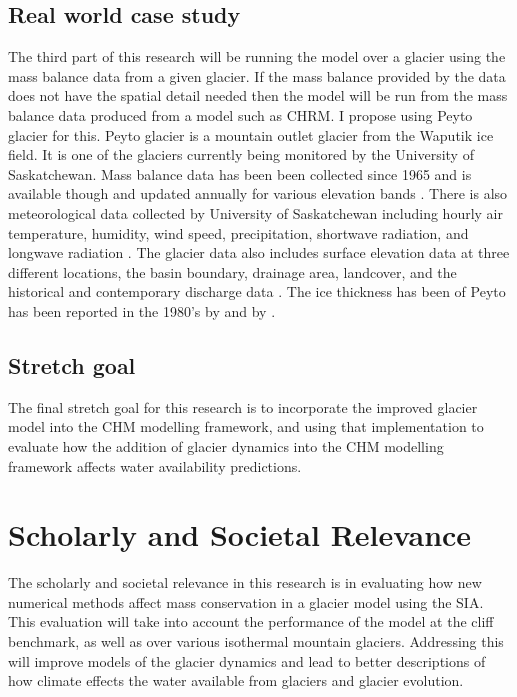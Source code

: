 \documentclass{article}
\begin{document}
\subsection{Real world case study}
The third part of this research will be running the model over a glacier using the mass balance data from a given glacier. If the mass balance provided by the data does not have the spatial detail needed then the model will be run from the mass balance data produced from a model such as CHRM. I propose using Peyto glacier for this. Peyto glacier is a mountain outlet glacier from the Waputik ice field. It is one of the glaciers currently being monitored by the University of Saskatchewan. Mass balance data has been been collected since 1965 and is available though \citet{WGMS2020} and updated annually for various elevation bands \citep{Pradhananga2020}. There is also meteorological data collected by University of Saskatchewan including hourly air temperature, humidity, wind speed, precipitation, shortwave radiation, and longwave radiation \citep{Pradhananga2020}. The glacier data also includes surface elevation data at three different locations, the basin boundary, drainage area, landcover, and the historical and contemporary discharge data \citep{Pradhananga2020}. The ice thickness has been of Peyto has been reported in the 1980's by \citet{Holdsworth2006} and by \citet{kehrl2014}. 


\subsection{Stretch goal}
The final stretch goal for this research is to incorporate the improved glacier model into the CHM modelling framework, and using that implementation to evaluate how the addition of glacier dynamics into the CHM modelling framework affects water availability predictions. 


\section{Scholarly and Societal Relevance}
The scholarly and societal relevance in this research is in evaluating how new numerical methods affect mass conservation in a glacier model using the SIA. This evaluation will take into account the performance of the model at the cliff benchmark, as well as over various isothermal mountain glaciers. Addressing this will improve models of the glacier dynamics and lead to better descriptions of how climate effects the water available from glaciers and glacier evolution. 
\end{document}
